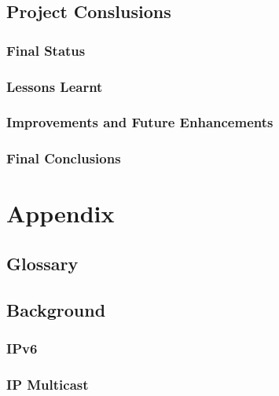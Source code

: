 \documentclass[a4paper,12pt]{report}
\begin{document}
\todo


\chapter{Project Conslusions}

\section{Final Status}



\section{Lessons Learnt}



\section{Improvements and Future Enhancements}



\section{Final Conclusions}

\todo


\part*{Appendix}

\appendix


\chapter{Glossary}




\chapter{Background}

\section{IPv6}



\section{IP Multicast}
\end{document}

